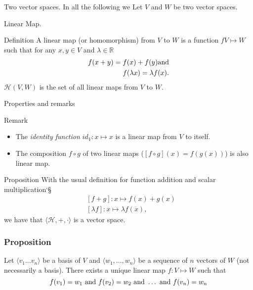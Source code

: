 \documentclass{beamer}
\begin{document}
\begin{frame}{Two vector spaces.}
  In all the following we Let $V$ and $W$ be two vector spaces.
\end{frame}

\begin{frame}{Linear Map.}
  \begin{block}{Definition}
    A linear map (or homomorphism) from $V$ to $W$ is a function $f V \mapsto W$ such that for any $x, y \in V$ and $\lambda \in \mathbb{R}$
    \[\begin{aligned}
    f(x + y) = f(x) + f(y) \textnormal{and}\\
    f(\lambda x) = \lambda f(x).
    \end{aligned}\]
    $\mathcal{H}(V, W)$ is the set of all linear maps from $V$ to $W$.
  \end{block}
\end{frame}

\begin{frame}{Properties and remarks}
  \begin{block}{Remark}
    \begin{itemize}
    \item The \emph{identity function} $id_{V}: x \mapsto x$ is a linear map from $V$ to itself.
    \item The composition $f \circ g$ of two linear maps ($[f \circ g](x) = f(g(x))$) is also linear map.
    \end{itemize}
  \end{block}

  \begin{block}{Proposition}
    With the usual definition for function addition and scalar multiplication`§
    \[\begin{aligned}
    &[f + g] : x \mapsto f(x) + g(x)\\
    &[\lambda f] : x \mapsto \lambda f(x),
    \end{aligned}\]
    we have that $\langle \mathcal{H}, +, \cdot  \rangle$ is a vector space.
  \end{block}
\end{frame}

\begin{frame}
  \frametitle{Proposition}
  Let $\langle v_1 \dots v_n \rangle$ be a basis of $V$ and $\langle w_1, \dots, w_n \rangle$ be a sequence of $n$ vectors of $W$ (not necessarily a basis). There exists a unique linear map $f: V \mapsto W$ such that
  \[f(v_1) = w_1 \textnormal{ and } f(v_2) = w_2 \textnormal{ and } \dots \textnormal{ and } f(v_n) = w_n\]
\end{frame}
\end{document}
